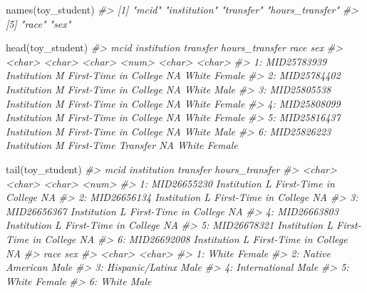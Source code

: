 \documentclass[
]{book}
\newenvironment{Shaded}{\begin{snugshade}}{\end{snugshade}}
\newcommand{\CommentTok}[1]{\textcolor[rgb]{0.56,0.35,0.01}{\textit{#1}}}
\newcommand{\FunctionTok}[1]{\textcolor[rgb]{0.00,0.00,0.00}{#1}}
\newcommand{\NormalTok}[1]{#1}
\begin{document}
\begin{Shaded}
\begin{Highlighting}[]
\FunctionTok{names}\NormalTok{(toy\_student)}
\CommentTok{\#\textgreater{} [1] "mcid"           "institution"    "transfer"       "hours\_transfer"}
\CommentTok{\#\textgreater{} [5] "race"           "sex"}

\FunctionTok{head}\NormalTok{(toy\_student)}
\CommentTok{\#\textgreater{}           mcid   institution              transfer hours\_transfer   race    sex}
\CommentTok{\#\textgreater{}         \textless{}char\textgreater{}        \textless{}char\textgreater{}                \textless{}char\textgreater{}          \textless{}num\textgreater{} \textless{}char\textgreater{} \textless{}char\textgreater{}}
\CommentTok{\#\textgreater{} 1: MID25783939 Institution M First{-}Time in College             NA  White Female}
\CommentTok{\#\textgreater{} 2: MID25784402 Institution M First{-}Time in College             NA  White   Male}
\CommentTok{\#\textgreater{} 3: MID25805538 Institution M First{-}Time in College             NA  White Female}
\CommentTok{\#\textgreater{} 4: MID25808099 Institution M First{-}Time in College             NA  White Female}
\CommentTok{\#\textgreater{} 5: MID25816437 Institution M First{-}Time in College             NA  White   Male}
\CommentTok{\#\textgreater{} 6: MID25826223 Institution M   First{-}Time Transfer             NA  White Female}

\FunctionTok{tail}\NormalTok{(toy\_student)}
\CommentTok{\#\textgreater{}           mcid   institution              transfer hours\_transfer}
\CommentTok{\#\textgreater{}         \textless{}char\textgreater{}        \textless{}char\textgreater{}                \textless{}char\textgreater{}          \textless{}num\textgreater{}}
\CommentTok{\#\textgreater{} 1: MID26655230 Institution L First{-}Time in College             NA}
\CommentTok{\#\textgreater{} 2: MID26656134 Institution L First{-}Time in College             NA}
\CommentTok{\#\textgreater{} 3: MID26656367 Institution L First{-}Time in College             NA}
\CommentTok{\#\textgreater{} 4: MID26663803 Institution L First{-}Time in College             NA}
\CommentTok{\#\textgreater{} 5: MID26678321 Institution L First{-}Time in College             NA}
\CommentTok{\#\textgreater{} 6: MID26692008 Institution L First{-}Time in College             NA}
\CommentTok{\#\textgreater{}               race    sex}
\CommentTok{\#\textgreater{}             \textless{}char\textgreater{} \textless{}char\textgreater{}}
\CommentTok{\#\textgreater{} 1:           White Female}
\CommentTok{\#\textgreater{} 2: Native American   Male}
\CommentTok{\#\textgreater{} 3: Hispanic/Latinx   Male}
\CommentTok{\#\textgreater{} 4:   International   Male}
\CommentTok{\#\textgreater{} 5:           White Female}
\CommentTok{\#\textgreater{} 6:           White   Male}
\end{Highlighting}
\end{Shaded}
\end{document}
